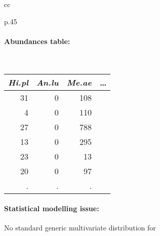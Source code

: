 \documentclass[8pt]{beamer}
\begin{document}
{\begin{tabular}{cc}
\begin{tabular}{p{}}
      \paragraph{Abundances table:} ~ \\
        {\footnotesize \begin{tabular}{rrrr}
        {\sl Hi.pl} & {\sl An.lu} & {\sl Me.ae} & \dots \\
        \hline
        31  &   0  & 108 & \\
         4  &   0  & 110 & \\
        27  &   0  & 788 & \\
        13  &   0  & 295 & \\
        23  &   0  &  13 & \\
        20  &   0  &  97 & \\
        . & . & . & 
      \end{tabular}} 
    \end{tabular}    
  \end{tabular}
  
  \bigskip
  \paragraph{Statistical modelling issue:} No standard generic multivariate distribution for 

}
\end{document}
